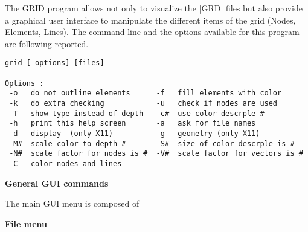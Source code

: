 
The GRID program allows not only to visualize 
the |GRD| files but also provide a graphical user interface 
to manipulate the different items of the grid (Nodes, Elements, Lines).
The command line and the options available for this program are following reported.

\begin{verbatim}
grid [-options] [files] 

Options :
 -o   do not outline elements      -f   fill elements with color  
 -k   do extra checking            -u   check if nodes are used   
 -T   show type instead of depth   -c#  use color descrple #         
 -h   print this help screen       -a   ask for file names        
 -d   display  (only X11)          -g   geometry (only X11)       
 -M#  scale color to depth #       -S#  size of color descrple is #  
 -N#  scale factor for nodes is #  -V#  scale factor for vectors is #
 -C   color nodes and lines     
\end{verbatim}

\textbf{General GUI commands}

\par
{}
\par
{}
\par
{}
\par
{}
\par

The main GUI menu is composed of

\par
{}\par
{}\par
{}\par
{}\par
{}\par
{}\par

\textbf{File menu}

\par
{}
\par
{}
\par
{}
\par
{}
\par

